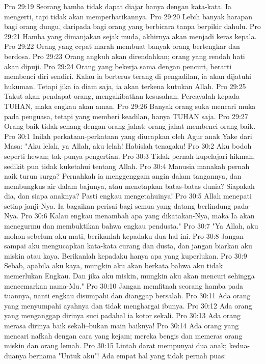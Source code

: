 Pro 29:19  Seorang hamba tidak dapat diajar hanya dengan kata-kata. Ia mengerti, tapi tidak akan memperhatikannya.
Pro 29:20  Lebih banyak harapan bagi orang dungu, daripada bagi orang yang berbicara tanpa berpikir dahulu.
Pro 29:21  Hamba yang dimanjakan sejak muda, akhirnya akan menjadi keras kepala.
Pro 29:22  Orang yang cepat marah membuat banyak orang bertengkar dan berdosa.
Pro 29:23  Orang angkuh akan direndahkan; orang yang rendah hati akan dipuji.
Pro 29:24  Orang yang bekerja sama dengan pencuri, berarti membenci diri sendiri. Kalau ia berterus terang di pengadilan, ia akan dijatuhi hukuman. Tetapi jika ia diam saja, ia akan terkena kutukan Allah.
Pro 29:25  Takut akan pendapat orang, mengakibatkan kesusahan. Percayalah kepada TUHAN, maka engkau akan aman.
Pro 29:26  Banyak orang suka mencari muka pada penguasa, tetapi yang memberi keadilan, hanya TUHAN saja.
Pro 29:27  Orang baik tidak senang dengan orang jahat; orang jahat membenci orang baik.
Pro 30:1  Inilah perkataan-perkataan yang diucapkan oleh Agur anak Yake dari Masa: "Aku lelah, ya Allah, aku lelah! Habislah tenagaku!
Pro 30:2  Aku bodoh seperti hewan; tak punya pengertian.
Pro 30:3  Tidak pernah kupelajari hikmah, sedikit pun tidak kuketahui tentang Allah.
Pro 30:4  Manusia manakah pernah naik turun surga? Pernahkah ia menggenggam angin dalam tangannya, dan membungkus air dalam bajunya, atau menetapkan batas-batas dunia? Siapakah dia, dan siapa anaknya? Pasti engkau mengetahuinya!
Pro 30:5  Allah menepati setiap janji-Nya. Ia bagaikan perisai bagi semua yang datang berlindung pada-Nya.
Pro 30:6  Kalau engkau menambah apa yang dikatakan-Nya, maka Ia akan menegurmu dan membuktikan bahwa engkau pendusta."
Pro 30:7  "Ya Allah, aku mohon sebelum aku mati, berikanlah kepadaku dua hal ini.
Pro 30:8  Jangan sampai aku mengucapkan kata-kata curang dan dusta, dan jangan biarkan aku miskin atau kaya. Berikanlah kepadaku hanya apa yang kuperlukan.
Pro 30:9  Sebab, apabila aku kaya, mungkin aku akan berkata bahwa aku tidak memerlukan Engkau. Dan jika aku miskin, mungkin aku akan mencuri sehingga mencemarkan nama-Mu."
Pro 30:10  Jangan memfitnah seorang hamba pada tuannya, nanti engkau disumpahi dan dianggap bersalah.
Pro 30:11  Ada orang yang menyumpahi ayahnya dan tidak menghargai ibunya.
Pro 30:12  Ada orang yang menganggap dirinya suci padahal ia kotor sekali.
Pro 30:13  Ada orang merasa dirinya baik sekali--bukan main baiknya!
Pro 30:14  Ada orang yang mencari nafkah dengan cara yang kejam; mereka bengis dan memeras orang miskin dan orang lemah.
Pro 30:15  Lintah darat mempunyai dua anak; kedua-duanya bernama "Untuk aku"! Ada empat hal yang tidak pernah puas:
